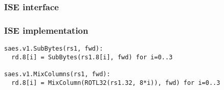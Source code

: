 
\subsubsection{ISE interface}



\subsubsection{ISE implementation}

\begin{lstlisting}[language=pseudo,style=block]
saes.v1.SubBytes(rs1, fwd):
  rd.8[i] = SubBytes(rs1.8[i], fwd) for i=0..3

saes.v1.MixColumns(rs1, fwd):
  rd.8[i] = MixColumn(ROTL32(rs1.32, 8*i)), fwd) for i=0..3
\end{lstlisting}


